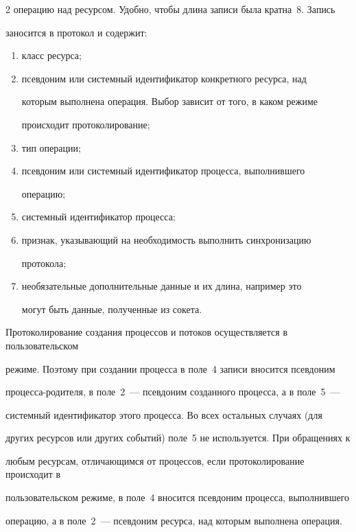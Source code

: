 \begin{multicols}{2}
операцию над ресурсом. Удобно, чтобы длина записи была кратна~8. Запись

заносится в протокол и содержит:

\begin{enumerate}[(1)]

\item класс ресурса;

\item псевдоним или системный идентификатор конкретного ресурса, над

которым выполнена операция. Выбор зависит от того, в каком режиме

происходит протоколирование;

\item тип операции;

\item псевдоним или системный идентификатор процесса, выполнившего

операцию;

\item системный идентификатор процесса;

\item признак, указывающий на необходимость выполнить синхронизацию

протокола;

\item необязательные дополнительные данные и их длина, например это

могут быть данные, полученные из сокета.

\end{enumerate}



Протоколирование создания процессов и потоков осуществляется в пользовательском 

режиме. Поэтому при создании процесса в по\-ле~4 записи вносится псевдоним 

процесса-родителя, в поле~2~--- псевдоним созданного процесса, а в поле~5~--- 

сис\-тем\-ный идентификатор этого процесса. Во всех остальных случаях (для 

других ресурсов или других событий) поле~5 не используется. При обращениях к 

любым ресурсам, отличающимся от процессов, если протоколирование происходит в 

пользовательском режиме, в поле~4 вносится псевдоним процесса, выполнившего 

операцию, а в поле~2~--- псевдоним ресурса, над которым выполнена операция.  


\end{multicols}
